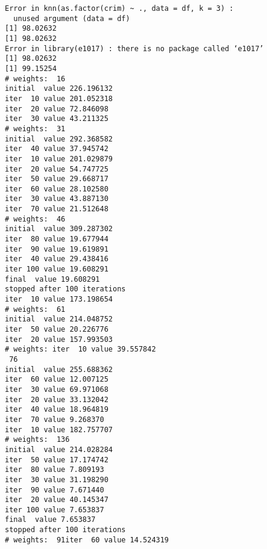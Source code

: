 \documentclass[11pt]{article}
\begin{document}
\begin{verbatim}
Error in knn(as.factor(crim) ~ ., data = df, k = 3) : 
  unused argument (data = df)
[1] 98.02632
[1] 98.02632
Error in library(e1017) : there is no package called ‘e1017’
[1] 98.02632
[1] 99.15254
# weights:  16
initial  value 226.196132 
iter  10 value 201.052318
iter  20 value 72.846098
iter  30 value 43.211325
# weights:  31
initial  value 292.368582 
iter  40 value 37.945742
iter  10 value 201.029879
iter  20 value 54.747725
iter  50 value 29.668717
iter  60 value 28.102580
iter  30 value 43.887130
iter  70 value 21.512648
# weights:  46
initial  value 309.287302 
iter  80 value 19.677944
iter  90 value 19.619891
iter  40 value 29.438416
iter 100 value 19.608291
final  value 19.608291 
stopped after 100 iterations
iter  10 value 173.198654
# weights:  61
initial  value 214.048752 
iter  50 value 20.226776
iter  20 value 157.993503
# weights: iter  10 value 39.557842
 76
initial  value 255.688362 
iter  60 value 12.007125
iter  30 value 69.971068
iter  20 value 33.132042
iter  40 value 18.964819
iter  70 value 9.268370
iter  10 value 182.757707
# weights:  136
initial  value 214.028284 
iter  50 value 17.174742
iter  80 value 7.809193
iter  30 value 31.198290
iter  90 value 7.671440
iter  20 value 40.145347
iter 100 value 7.653837
final  value 7.653837 
stopped after 100 iterations
# weights:  91iter  60 value 14.524319


\end{verbatim}
\end{document}
